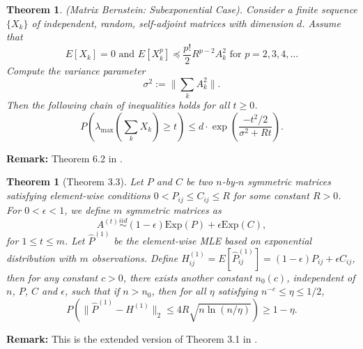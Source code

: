 \documentclass[a4paper]{article}
\newtheorem{theorem}[fact]{Theorem}
\begin{document}
\begin{theorem}
\label{thm:BernsteinMatrix}
(Matrix Bernstein: Subexponential Case). Consider a finite sequence $\{X_k\}$ of
independent, random, self-adjoint matrices with dimension $d$. Assume that
\[
	E[X_k] = 0 \text{\ \ \ and \ \ \ }  E[X_k^p] \preceq \frac{p!}{2} R^{p-2} A_k^2 \text{\ \ for } p = 2,3,4, \dots
\]
Compute the variance parameter
\[
	\sigma^2 := \|\sum_k A_k^2\|.
\]
Then the following chain of inequalities holds for all $t \ge 0$.
\[
	P \left( \lambda_{\max} \left( \sum_k X_k \right) \ge t \right) \le d \cdot \exp \left( \frac{-t^2/2}{\sigma^2 + R t} \right).
\]
\end{theorem}
\textbf{Remark:} Theorem 6.2 in \cite{tropp2012user}.








\begin{theorem}[Theorem 3.3]
\label{thm:P1Diff}
Let $P$ and $C$ be two $n$-by-$n$ symmetric matrices satisfying element-wise conditions $0 < P_{ij} \le C_{ij} \le R$ for some constant $R > 0$. For $0 < \epsilon < 1$, we define $m$ symmetric matrices as
\[
	A^{(t)} \stackrel{iid}{\sim} (1-\epsilon) \mathrm{Exp}(P) + \epsilon \mathrm{Exp}(C),
\]
for $1 \le t \le m$.
Let $\hat{P}^{(1)}$ be the element-wise MLE based on exponential distribution with $m$ observations.
Define $H_{ij}^{(1)} = E[\hat{P}_{ij}^{(1)}] = (1-\epsilon) P_{ij} + \epsilon C_{ij}$,
then for any constant $c > 0$, there exists another constant $n_0(c)$, independent of $n$, $P$, $C$ and $\epsilon$, such that if $n > n_0$, then for all $\eta$ satisfying $n^{-c} \le \eta \le 1/2$,
\[
	P \left( \| \hat{P}^{(1)} - H^{(1)} \|_2 \le 4 R \sqrt{n \ln(n/\eta)}\right) \ge 1 - \eta.
\]
\end{theorem}
\textbf{Remark:} This is the extended version of Theorem 3.1 in \cite{oliveira2009concentration}.
\end{document}
